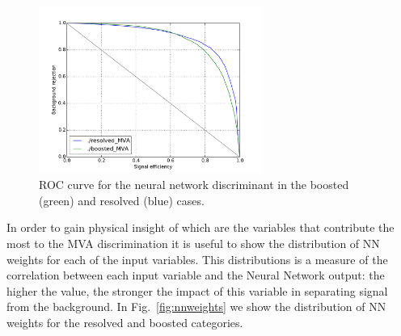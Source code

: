 \begin{figure}[t]
\begin{center}
\includegraphics[width=0.65\textwidth]{plots/example_roc.pdf}
\caption{\small ROC curve for the neural network discriminant in the boosted (green) and resolved (blue) cases.}
\label{fig:exampleroc}
\end{center}
\end{figure}

In order to gain physical insight of which are the variables that
contribute the most to the MVA discrimination it is useful
to show the distribution of NN weights for each of the
input variables.
%
This distributions is a measure of the correlation between
each input variable and the Neural Network output: the higher
the value, the stronger the impact of this variable in
separating signal from the background.
%
In Fig.~\ref{fig:nnweights} we show
the distribution of NN weights for the resolved and boosted categories.

